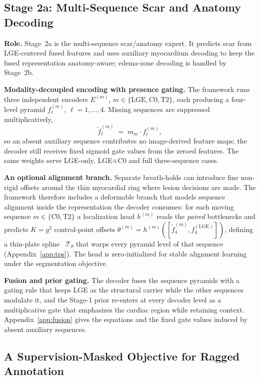 \documentclass[runningheads]{llncs}
\newcommand{\LGE}{\mathrm{LGE}}
\newcommand{\Cz}{\mathrm{C0}}
\newcommand{\TT}{\mathrm{T2}}
\begin{document}
\subsection{Stage 2a: Multi-Sequence Scar and Anatomy Decoding}

\noindent\textbf{Role.} Stage~2a is the multi-sequence scar/anatomy expert. It
predicts scar from LGE-centered fused features and uses auxiliary myocardium
decoding to keep the fused representation anatomy-aware; edema-zone decoding is
handled by Stage~2b.

\noindent\textbf{Modality-decoupled encoding with presence gating.} The framework
runs three independent encoders
$E^{(m)}$, $m\in\{\LGE,\Cz,\TT\}$, each producing a four-level pyramid
$f^{(m)}_\ell$, $\ell=1,\dots,4$. Missing sequences are suppressed
multiplicatively,
\begin{equation}
\tilde{f}^{(m)}_\ell \;=\; m_m \cdot f^{(m)}_\ell ,
\end{equation}
so an absent auxiliary sequence contributes no image-derived feature maps; the
decoder still receives fixed sigmoid gate values from the zeroed features. The
same weights serve LGE-only, LGE+C0 and full three-sequence cases.

\noindent\textbf{An optional alignment branch.} Separate breath-holds can
introduce fine non-rigid offsets around the thin myocardial ring where lesion
decisions are made. The framework therefore includes a deformable branch that models
sequence alignment inside the representation the decoder consumes: for each moving
sequence $m\in\{\Cz,\TT\}$ a localization head $h^{(m)}$ reads the \emph{paired}
bottlenecks and predicts $K=g^2$ control-point offsets
$\theta^{(m)}=h^{(m)}([\tilde{f}^{(m)}_4, f^{(\LGE)}_4])$, defining a thin-plate
spline~\cite{bookstein1989principal} $\mathcal{T}_{\theta}$ that warps every
pyramid level of that sequence (Appendix~\ref{app:tps}). The head is
zero-initialized for stable alignment learning under the segmentation objective.

\noindent\textbf{Fusion and prior gating.} The decoder fuses the sequence
pyramids with a gating rule that keeps LGE as the structural carrier while the
other sequences modulate it, and the Stage-1 prior re-enters at every decoder
level as a multiplicative gate that emphasizes the cardiac region while retaining
context. Appendix~\ref{app:fusion} gives the equations and the fixed gate
values induced by absent auxiliary sequences.

\subsection{A Supervision-Masked Objective for Ragged Annotation}
\end{document}
